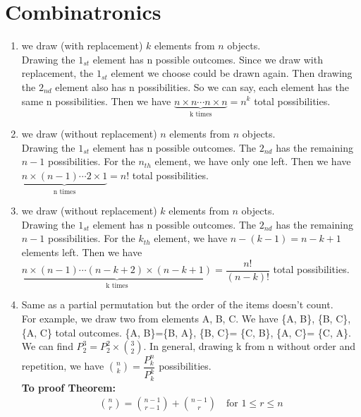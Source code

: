 \documentclass[12pt,a4paper,titlepage]{article}\usepackage[]{graphicx}\usepackage[]{color}
\begin{document}
%
\section{Combinatronics}

\begin{enumerate}
\item we draw (with replacement) $k$ elements from $n$ objects.\\
Drawing the $1_{st}$ element has n possible outcomes. Since we draw with replacement, the $1_{st}$ element we choose could be drawn again. Then drawing the $2_{nd}$ element also has n possibilities. So we can say, each element has the same n possibilities. Then we have $\underbrace{n\times n \cdots n\times n}_{\text{k times}} = n^k$ total possibilities.

\item we draw (without replacement) $n$ elements from $n$ objects.\\
Drawing the $1_{st}$ element has n possible outcomes. The $2_{nd}$ has the remaining $n-1$ possibilities. For the $n_{th}$ element, we have only one left. Then we have $\underbrace{n\times (n-1) \cdots 2\times 1}_{\text{n times}} = n!$ total possibilities.
\item we draw (without replacement) $k$ elements from $n$ objects.\\
Drawing the $1_{st}$ element has n possible outcomes. The $2_{nd}$ has the remaining $n-1$ possibilities. For the $k_{th}$ element, we have $n-(k-1)=n-k+1$ elements left. Then we have $\underbrace{n\times (n-1) \cdots (n-k+2)\times (n-k+1)}_{\text{k times}}=\dfrac{n!}{(n-k)!}$ total possibilities.
\item Same as a partial permutation but the order of the items doesn't count.\\
For example, we draw two from elements A, B, C. We have \{A, B\}, \{B, C\}, \{A, C\} total outcomes. \{A, B\}=\{B, A\},  \{B, C\}= \{C, B\},  \{A, C\}= \{C, A\}. We can find $P_2^3=P_2^2 \times {3 \choose 2}$. In general, drawing k from n without order and repetition, we have ${n \choose k}=\dfrac{P^n_k}{P^k_k} $ possibilities.\\

\textbf{To proof Theorem:}
\begin{align}
{n \choose r}={n-1 \choose r-1}+{n-1 \choose r} \quad \text{for } 1\leq r\leq n
\end{align}


\end{enumerate}
\end{document}
